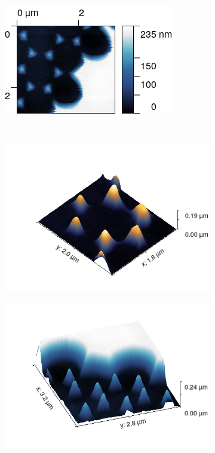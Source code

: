 \documentclass[11pt,a4paper]{article}
\begin{document}
\begin{figure}[H]
\begin{subfigure}[b]{0.45\textwidth}
\includegraphics[width=\textwidth]{sm_sample2_border}
\caption{}
\end{subfigure}\\\vspace{.2cm}
\begin{subfigure}[b]{0.45\textwidth}
\includegraphics[width=\textwidth]{sm_sample2_3D}
\caption{}
\end{subfigure}
\begin{subfigure}[b]{0.45\textwidth}
\includegraphics[width=\textwidth]{sm_sample2_border_3D}

\end{subfigure}
\end{figure}
\end{document}
